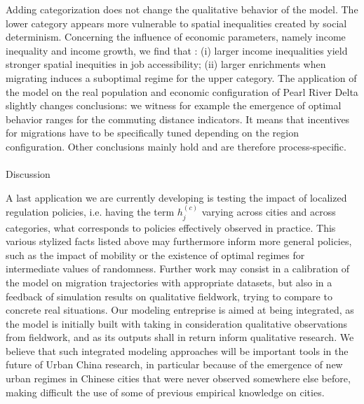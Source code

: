 Adding categorization does not change the qualitative behavior of the model. %
The lower category appears more vulnerable to spatial inequalities created by social determinism. Concerning the influence of economic parameters, namely income inequality and income growth, we find that : (i) larger income inequalities yield stronger spatial inequities in job accessibility; (ii) larger enrichments when migrating induces a suboptimal regime for the upper category. The application of the model on the real population and economic configuration of Pearl River Delta slightly changes conclusions: we witness for example the emergence of optimal behavior ranges for the commuting distance indicators. It means that incentives for migrations have to be specifically tuned depending on the region configuration. Other conclusions mainly hold and are therefore process-specific.



\paragraph{}{Discussion}


A last application we are currently developing is testing the impact of localized regulation policies, i.e. having the term $h_j^{(c)}$ varying across cities and across categories, what corresponds to policies effectively observed in practice. This various stylized facts listed above may furthermore inform more general policies, such as the impact of mobility or the existence of optimal regimes for intermediate values of randomness. Further work may consist in a calibration of the model on migration trajectories with appropriate datasets, but also in a feedback of simulation results on qualitative fieldwork, trying to compare to concrete real situations. Our modeling entreprise is aimed at being integrated, as the model is initially built with taking in consideration qualitative observations from fieldwork, and as its outputs shall in return inform qualitative research. We believe that such integrated modeling approaches will be important tools in the future of Urban China research, in particular because of the emergence of new urban regimes in Chinese cities that were never observed somewhere else before, making difficult the use of some of previous empirical knowledge on cities.






